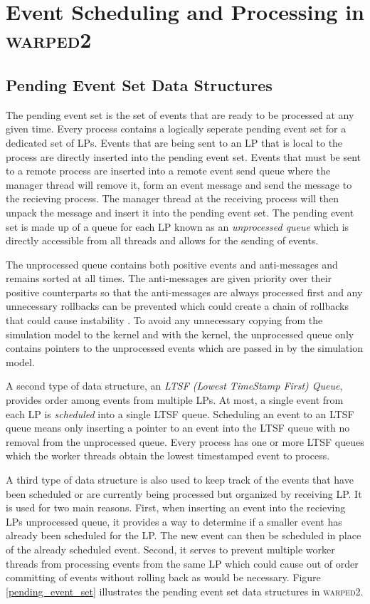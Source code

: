 \documentclass[11pt]{book}
\begin{document}
\chapter[Event Scheduling]{Event Scheduling and Processing in \textsc{warped2}}\label{warped2_ds}

\section{Pending Event Set Data Structures}

The pending event set is the set of events that are ready to be processed at any given time.
Every process contains a logically seperate pending event set for a dedicated set of LPs.  Events
that are being sent to an LP that is local to the process are directly inserted into the pending
event set.  Events that must be sent to a remote process are inserted into a remote event send
queue where the manager thread will remove it, form an event message and send the message to
the recieving process.  The manager thread at the receiving process will then unpack the message
and insert it into the pending event set.  The pending event set is made up of a queue for each
LP known as an \emph{unprocessed queue} which is directly accessible from all threads and allows
for the sending of events.

The unprocessed queue contains both positive events and anti-messages and remains sorted at all
times.  The anti-messages are given priority over their positive counterparts so that the
anti-messages are always processed first and any unnecessary rollbacks can be prevented which
could create a chain of rollbacks that could cause instability \cite{lubachevsky-89}.  To avoid
any unnecessary copying from the simulation model to the kernel and with the kernel, the
unprocessed queue only contains pointers to the unprocessed events which are passed in by the
simulation model.

A second type of data structure, an \emph{LTSF (Lowest TimeStamp First) Queue}, provides
order among events from multiple LPs.  At most, a single event from each LP is \emph{scheduled}
into a single LTSF queue.  Scheduling an event to an LTSF queue means only inserting a pointer
to an event into the LTSF queue with no removal from the unprocessed queue.  Every process has
one or more LTSF queues which the worker threads obtain the lowest timestamped event to process.

A third type of data structure is also used to keep track of the events that have been
scheduled or are currently being processed but organized by receiving LP.  It is used for
two main reasons.  First, when inserting an event into the recieving LPs unprocessed queue, it
provides a way to determine if a smaller event has already been scheduled for the LP.  The new
event can then be scheduled in place of the already scheduled event.  Second, it serves to
prevent multiple worker threads from processing events from the same LP which could cause
out of order committing of events without rolling back as would be necessary.
Figure \ref{pending_event_set} illustrates the pending event set data structures in
\textsc{warped2}.
\end{document}
